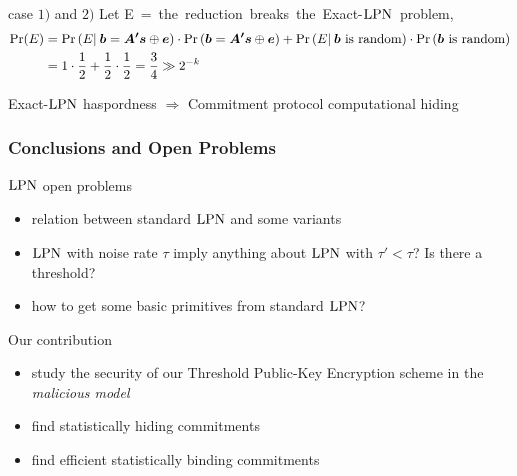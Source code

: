 \begin{frame}

  \begin{center}
  \end{center}

  \begin{block}{case $1)$ and $2)$ }
  Let \mbox{E = {the reduction breaks the Exact-$\mathrm{LPN}$ problem}},  
  \begin{align*}
    \Pr(E) &= \Pr \left( E | \:\boldsymbol{b}  = \boldsymbol{A'} \boldsymbol{s} \mathbin{\oplus} \boldsymbol{e}  \right)  \cdot  \Pr \left( \boldsymbol{b}  = \boldsymbol{A'} \boldsymbol{s} \mathbin{\oplus} \boldsymbol{e}  \right)  + \Pr \left( E   | \: \boldsymbol{b} \text{ is random}  \right)   \cdot \Pr \left(   \boldsymbol{b} \text{ is random} \right) \\
	  &=  1  \cdot   \frac{1}{2}  +  \frac{1}{2}  \cdot  \frac{1}{2} = \frac{3}{4} \gg 2^{-k}
  \end{align*}
  \begin{center}   
 Exact-$\mathrm{LPN}$ haspordness $\Rightarrow$ Commitment protocol computational hiding
  \end{center}
  \end{block}

\end{frame}

\begin{frame}
 \frametitle{Conclusions and Open Problems}
 
 \begin{block}{$\mathrm{LPN}$ open problems}
  \begin{itemize}
   \item relation between standard $\mathrm{LPN}$ and some variants
   \item $\mathrm{LPN}$ with noise rate $\tau$ imply anything about $\mathrm{LPN}$ with $\tau' < \tau$? Is there a threshold?
   \item how to get some basic primitives from standard $\mathrm{LPN}$?
  \end{itemize}

 \end{block}
 
 \begin{block}{Our contribution}
\begin{itemize}
 \item study the security of our Threshold Public-Key Encryption scheme in the \emph{malicious model}
 \item find statistically hiding commitments
 \item find efficient statistically binding commitments
\end{itemize}
  
 \end{block}

\end{frame}
